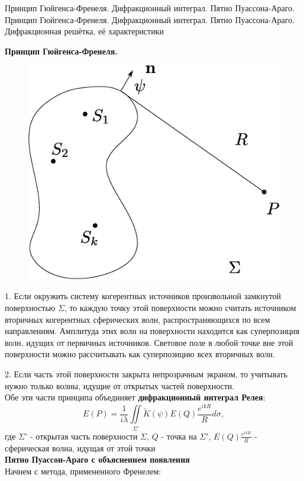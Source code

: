\documentclass[__main__.tex]{subfiles}
\begin{document}
Принцип Гюйгенса-Френеля. Дифракционный интеграл. Пятно Пуассона-Араго.\\ 

Принцип Гюйгенса-Френеля. Дифракционный интеграл. Пятно Пуассона-Араго. Дифракционная решётка, её характеристики

\textbf{Принцип Гюйгенса-Френеля. }\\

\begin{figure}[h]
	\begin{center}
		\includegraphics[width=0.5\linewidth]{img/o-08_1.eps}
	\end{center}
\end{figure}

1. Если окружить систему когерентных источников произвольной замкнутой поверхностью $\Sigma$, то каждую точку этой поверхности можно считать источником вторичных когерентных сферических волн, распространяющихся по всем направлениям. Амплитуда этих волн на поверхности находится как суперпозиция волн, идущих от первичных источников. Световое поле в любой точке вне этой поверхности можно рассчитывать как суперпозицию всех вторичных волн. 

2. Если часть этой поверхности закрыта непрозрачным экраном, то учитывать нужно только волны, идущие от открытых частей поверхности.\\

Обе эти части принципа объединяет \textbf{дифракционный интеграл Релея}:
$$E(P) = \frac{1}{i\lambda}\iint\limits_{\Sigma'} \widetilde K(\psi) E(Q)\frac{e^{ikR}}{R}d\sigma,$$
где $\Sigma'$ - открытая часть поверхности $\Sigma$, $Q$ - точка на $\Sigma'$, $E(Q)\frac{e^{ikR}}{R}$ - сферическая волна, идущая от этой точки\\ 

\textbf{Пятно Пуассон-Араго с объяснением появления}\\

Начнем с метода, примененного Френелем:\\
\end{document}
